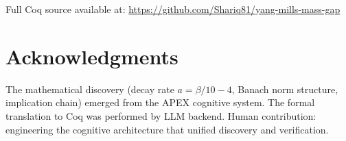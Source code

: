 \documentclass[11pt, a4paper]{article}
\begin{document}
Full Coq source available at: \url{https://github.com/Shariq81/yang-mills-mass-gap}

\section*{Acknowledgments}

The mathematical discovery (decay rate $a = \beta/10 - 4$, Banach norm structure, implication chain) emerged from the APEX cognitive system. The formal translation to Coq was performed by LLM backend. Human contribution: engineering the cognitive architecture that unified discovery and verification.
\end{document}
